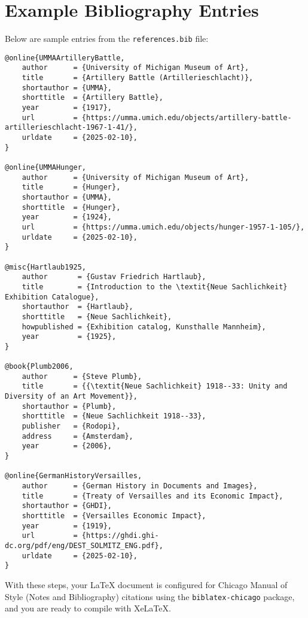 \documentclass{article}
\begin{document}
\vspace{1em}
\clearpage

\section{Example Bibliography Entries}

Below are sample entries from the \texttt{references.bib} file:

\begin{lstlisting}
@online{UMMAArtilleryBattle,
    author      = {University of Michigan Museum of Art},
    title       = {Artillery Battle (Artillerieschlacht)},
    shortauthor = {UMMA},
    shorttitle  = {Artillery Battle},
    year        = {1917},
    url         = {https://umma.umich.edu/objects/artillery-battle-artillerieschlacht-1967-1-41/},
    urldate     = {2025-02-10},
}

@online{UMMAHunger,
    author      = {University of Michigan Museum of Art},
    title       = {Hunger},
    shortauthor = {UMMA},
    shorttitle  = {Hunger},
    year        = {1924},
    url         = {https://umma.umich.edu/objects/hunger-1957-1-105/},
    urldate     = {2025-02-10},
}

@misc{Hartlaub1925,
    author       = {Gustav Friedrich Hartlaub},
    title        = {Introduction to the \textit{Neue Sachlichkeit} Exhibition Catalogue},
    shortauthor  = {Hartlaub},
    shorttitle   = {Neue Sachlichkeit},
    howpublished = {Exhibition catalog, Kunsthalle Mannheim},
    year         = {1925},
}

@book{Plumb2006,
    author      = {Steve Plumb},
    title       = {{\textit{Neue Sachlichkeit} 1918--33: Unity and Diversity of an Art Movement}},
    shortauthor = {Plumb},
    shorttitle  = {Neue Sachlichkeit 1918--33},
    publisher   = {Rodopi},
    address     = {Amsterdam},
    year        = {2006},
}

@online{GermanHistoryVersailles,
    author      = {German History in Documents and Images},
    title       = {Treaty of Versailles and its Economic Impact},
    shortauthor = {GHDI},
    shorttitle  = {Versailles Economic Impact},
    year        = {1919},
    url         = {https://ghdi.ghi-dc.org/pdf/eng/DEST_SOLMITZ_ENG.pdf},
    urldate     = {2025-02-10},
}
\end{lstlisting}

\vspace{1em}

With these steps, your LaTeX document is configured for Chicago Manual of Style (Notes and Bibliography) citations using the \texttt{biblatex-chicago} package, and you are ready to compile with XeLaTeX.
\end{document}
